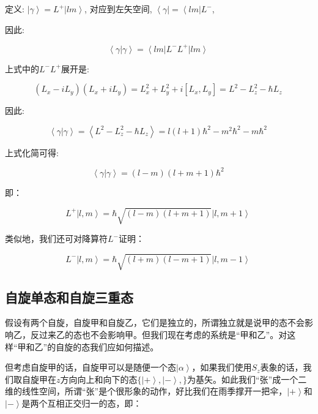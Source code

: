 定义: $\left| \gamma \right\rangle = L^+ \left| lm
\right\rangle$, 对应到左矢空间, $\left\langle \gamma \right| =
\left\langle lm  \right| L^-$,

因此:

\begin{equation}
\left\langle \gamma | \gamma \right\rangle = \left\langle lm \right|
L^- L^+ \left| lm \right\rangle~
\end{equation}

上式中的$L^- L^+$展开是:

\begin{equation}
(L_x-iL_y) (L_x + i L_y) = L_x^2 + L_y^2 +i [L_x, L_y] = L^2 - L_z^2
- \hbar L_z~
\end{equation}

因此:

\begin{equation}
\left\langle \gamma | \gamma \right\rangle = \left\langle L^2 -
L_z^2 - \hbar L_z \right\rangle = l(l+1)\hbar^2 - m^2\hbar^2 -m
\hbar^2~
\end{equation}

上式化简可得:

\begin{equation}
\left\langle \gamma | \gamma \right\rangle =  (l - m)(l+m+1)\hbar^2~
\end{equation}

即：

\begin{equation}
L^+  \left| l, m \right\rangle = \hbar \sqrt{(l - m)(l + m +1) } \left|l, m + 1 \right\rangle~
\end{equation}

类似地，我们还可对降算符$L^-$证明：

\begin{equation}
L^-  \left| l, m \right\rangle = \hbar \sqrt{(l + m)(l - m +1) } \left|l, m - 1 \right\rangle~
\end{equation}

\subsection{自旋单态和自旋三重态}

假设有两个自旋，自旋甲和自旋乙，它们是独立的，所谓独立就是说甲的态不会影响乙，反过来乙的态也不会影响甲。但我们现在考虑的系统是“甲和乙”。对这样“甲和乙”的自旋的态我们应如何描述。

但考虑自旋甲的话，自旋甲可以是随便一个态$\left| \alpha \right\rangle$，如果我们使用$S_z$表象的话，我们取自旋甲在$z$方向向上和向下的态$\{ \left| + \right\rangle, \left| - \right\rangle,   \}$为基矢。如此我们“张”成一个二维的线性空间，所谓“张”是个很形象的动作，好比我们在雨季撑开一把伞，$\left| + \right\rangle$和$\left| - \right\rangle$是两个互相正交归一的态，即：

